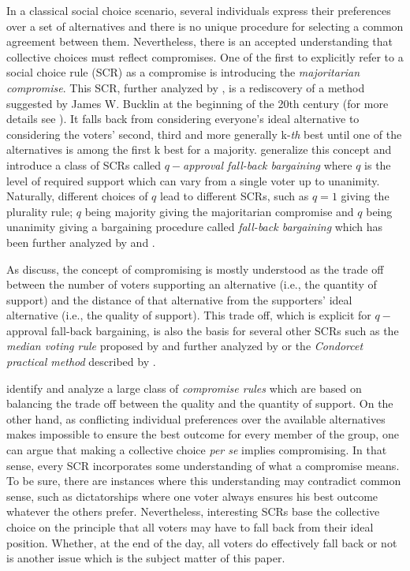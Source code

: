 \documentclass[version=3.21, pagesize, twoside=off, bibliography=totoc, DIV=calc, fontsize=12pt, a4paper]{scrartcl}
\begin{document}
In a classical social choice scenario, several individuals express their preferences over a set of alternatives and there is no unique procedure for selecting a common agreement between them. Nevertheless, there is an accepted understanding that collective choices must reflect compromises. One of the first to explicitly refer to a social choice rule (SCR) as a compromise is \citet{Sertel1986} introducing the \textit{majoritarian compromise}. This SCR, further analyzed by \citet{Sertel1999}, is a rediscovery of a method suggested by James W. Bucklin at the beginning of the 20th century (for more details see \citet{Erdelyi2015}). It falls back from considering everyone’s ideal alternative to considering the voters’ second, third and more generally k-\emph{th} best until one of the alternatives is among the first k best for a majority. \citet{Brams2001} generalize this concept and introduce a class of SCRs called $q-$\textit{approval fall-back bargaining }where $q$ is the level of required support which can vary from a single voter up to unanimity. Naturally, different choices of $q$ lead to different SCRs, such as $q=1$ giving the plurality rule; $q$ being majority giving the majoritarian compromise and $q$ being unanimity giving a bargaining procedure called \textit{fall-back bargaining} which has been further analyzed by \citet{Kibris2007} and \citet{Congar2012}. 

As \citet{OezkalSanver2004} discuss, the concept of compromising is mostly understood as the trade off between the number of voters supporting an alternative (i.e., the quantity of support) and the distance of that alternative from the supporters' ideal alternative (i.e., the quality of support). This trade off, which is explicit for $q-$approval fall-back bargaining, is also the basis for several other SCRs such as the \textit{median voting rule} proposed by \citet{Bassett1999} and further analyzed by \citet{Gehrlein2003} or the \textit{Condorcet practical method }described by \citet{Nurmi1999}.

\citet{Merlin2019} identify and analyze a large class of \textit{compromise rules} which are based on balancing the trade off between the quality and the quantity of support. On the other hand, as conflicting
individual preferences over the available alternatives makes impossible to ensure the best outcome for every member of the group, one can argue that making a collective choice \textit{per se} implies compromising. In that sense, every SCR incorporates some understanding of what a compromise means. To be sure, there are instances where this understanding may contradict common sense, such as dictatorships where one voter always ensures his best outcome whatever the others prefer. Nevertheless, interesting SCRs base the collective choice on the principle that all voters may have to fall back from their ideal position. Whether, at the end of the day, all voters do effectively fall back or not is another issue which is the subject matter of this paper.
\end{document}
